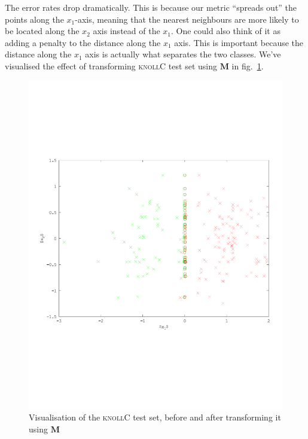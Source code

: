 \documentclass{article}
\newcommand{\vect}[1]{\ensuremath{\boldsymbol{\mathbf{#1}}}\xspace}
\newcommand{\knollC}{\textsc{knollC}\xspace}
\begin{document}
The error rates drop dramatically. This is because our metric ``spreads out'' the points along the $x_1$-axis, meaning that the nearest neighbours are more likely to be located along the $x_2$ axis instead of the $x_1$. One could also think of it as adding a penalty to the distance along the $x_1$ axis. This is important because the distance along the $x_1$ axis is actually what separates the two classes. We've visualised the effect of transforming \knollC test set using \vect{M} in fig.~\ref{fig:knollCd}.

\begin{figure}
\centering
\includegraphics[width=.8\textwidth]{src/knollCdmetr.pdf}
\caption{Visualisation of the \knollC test set, before and after transforming it using \vect{M}}
\label{fig:knollCd}
\end{figure}
\end{document}
